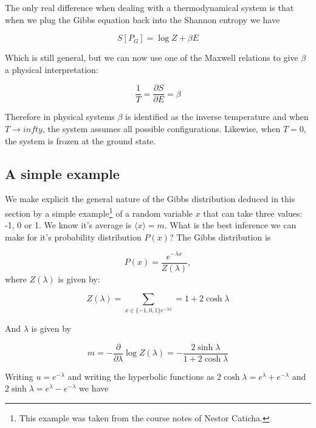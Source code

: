 The only real difference when dealing with a thermodynamical system is that when we plug the Gibbs equation back into the Shannon entropy we have

\begin{equation}
    S[P_G] = \log Z + \beta E
\end{equation}

Which is still general, but we can now use one of the Maxwell relations to give $\beta$ a physical interpretation:

\begin{equation}
   \frac{1}{T} = \frac{\partial S}{\partial E} = \beta
\end{equation}

Therefore in physical systems $\beta$ is identified as the inverse temperature and when $T \to infty$, the system assumes all possible configurations. Likewise, when $T = 0$, the system is frozen at the ground state. 


\subsection{A simple example}

We make explicit the general nature of the Gibbs distribution deduced in this section by a simple example\footnote{This example was taken from the course notes of Nestor Caticha.} of a random variable $x$ that can take three values: -1, 0 or 1. We know it's average is $\langle x \rangle = m$. What is the best inference we can make for it's probability distribution $P(x)$? The Gibbs distribution is

\begin{equation}
   P(x) = \frac{e^{-\lambda x}}{Z(\lambda)},
\end{equation}
where $Z(\lambda)$ is given by:

\begin{equation}
   Z(\lambda) = \sum_{x\in \{-1, 0, 1\} e^{-\lambda x}} =
   1 + 2\cosh \lambda
\end{equation}

And $\lambda$ is given by

\begin{equation}
   m = - \frac{\partial}{\partial \lambda} \log Z(\lambda) =  - \frac{2 \sinh \lambda}{1 + 2 \cosh \lambda}
\end{equation}

Writing $u = e^{-\lambda}$ and writing the hyperbolic functions as $2 \cosh \lambda = e^\lambda + e^{-\lambda}$ and $2 \sinh \lambda = e^\lambda - e^{-\lambda}$ we have

